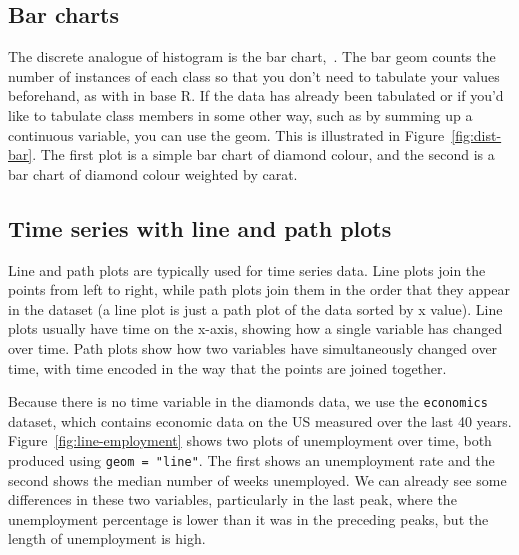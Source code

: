 \subsection{Bar charts}
\label{sub:bar}

The discrete analogue of histogram is the bar chart,~. The bar geom counts the number of instances of each class so that you don't need to tabulate your values beforehand, as with  in base R. If the data has already been tabulated or if you'd like to tabulate class members in some other way, such as by summing up a continuous variable, you can use the  geom. This is illustrated in Figure~\ref{fig:dist-bar}. The first plot is a simple bar chart of diamond colour, and the second is a bar chart of diamond colour weighted by carat.

% 


\subsection{Time series with line and path plots}
\label{sub:line}

Line and path plots are typically used for time series data.  Line plots join the points from left to right, while path plots join them in the order that they appear in the dataset (a line plot is just a path plot of the data sorted by x value).  Line plots usually have time on the x-axis, showing how a single variable has changed over time.  Path plots show how two variables have simultaneously changed over time, with time encoded in the way that the points are joined together.

Because there is no time variable in the diamonds data, we use the {\tt economics} dataset, which contains economic data on the US measured over the last 40 years. Figure~\ref{fig:line-employment} shows two plots of unemployment over time, both produced using {\tt geom = "line"}. The first shows an unemployment rate and the second shows the median number of weeks unemployed. We can already see some differences in these two variables, particularly in the last peak, where the unemployment percentage is lower than it was in the preceding peaks, but the length of unemployment is high.

